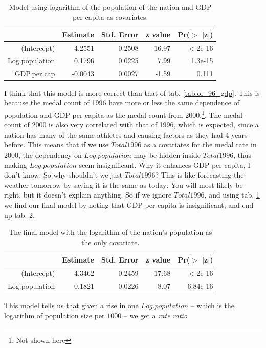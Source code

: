 \documentclass[a4paper,norsk, 10pt]{article}
\begin{document}
\begin{table}[!htb]
\centering
\begin{tabular}{rrrrr}
  \hline
 & Estimate & Std. Error & z value & Pr($>$ $|$z$|$) \\ 
  \hline
(Intercept) & -4.2551 & 0.2508 & -16.97 & < 2e-16 \\ 
  Log.population & 0.1796 & 0.0225 & 7.99 & 1.3e-15 \\ 
  GDP.per.cap & -0.0043 & 0.0027 & -1.59 & 0.111 \\ 
   \hline
\end{tabular}
\caption{Model using logarithm of the population of the nation and GDP per capita as covariates.}\label{tab:ol_pop_gdp}
\end{table}

I think that this model is more correct than that of tab. \ref{tab:ol_96_gdp}. This is because the medal count of 1996 have more or less the same dependence of population and GDP per capita as the medal count from 2000.\footnote{Not shown here}. The medal count of 2000 is also very correlated with that of 1996, which is expected, since a nation has many of the same athletes and causing factors as they had 4 years before. This means that if we use $Total1996$ as a covariates for the medal rate in 2000, the dependency on $Log.population$ may be hidden inside $Total1996$, thus making $Log.population$ seem insignificant. Why it enhances GDP per capita, I don't know. So why shouldn't we just $Total1996$? This is like forecasting the weather tomorrow by saying it is the same as today: You will most likely be right, but it doesn't explain anything. So if we ignore $Total1996$, and using tab. \ref{tab:ol_pop_gdp} we find our final model by noting that GDP per capita is insignificant, and end up tab. \ref{tab:ol_pop}.


\begin{table}[!htb]
\centering
\begin{tabular}{rrrrr}
  \hline
 & Estimate & Std. Error & z value & Pr($>$ $|$z$|$) \\ 
  \hline
(Intercept) & -4.3462 & 0.2459 & -17.68 & < 2e-16 \\ 
  Log.population & 0.1821 & 0.0226 & 8.07 & 6.84e-16 \\ 
   \hline
\end{tabular}
\caption{The final model with the logarithm of the nation's population as the only covariate.}\label{tab:ol_pop}
\end{table}

This model tells us that given a rise in one $Log.population$ -- which is the logarithm of population size per $1000$ -- we get a \textit{rate ratio}
\end{document}
